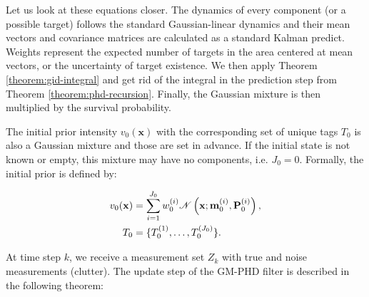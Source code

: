 Let us look at these equations closer. The dynamics of every component (or a possible target) follows the standard Gaussian-linear dynamics and their mean vectors and covariance matrices are calculated as a standard Kalman predict. Weights represent the expected number of targets in the area centered at mean vectors, or the uncertainty of target existence. We then apply Theorem \ref{theorem:gid-integral} and get rid of the integral in the prediction step from Theorem \ref{theorem:phd-recursion}. Finally, the Gaussian mixture is then multiplied by the survival probability.

The initial prior intensity $v_{0}(\mathbf{x})$ with the corresponding set of unique tags $T_0$ is also a Gaussian mixture and those are set in advance. If the initial state is not known or empty, this mixture may have no components, i.e. $J_0 = 0$. Formally, the initial prior is defined by:

\begin{align}
    v_0(\mathbf{x}) &= \sum_{i=1}^{J_0} w_{0}^{(i)} \mathscr{N}\left(\mathbf{x}; \vecat{m}{0}^{(i)}, \vecat{P}{0}^{(i)}\right), \\
    T_0 &= \{ T_0^{(1)}, \ldots, T_0^{(J_0)} \}.
\end{align}

At time step $k$, we receive a measurement set $Z_k$ with true and noise measurements (clutter). The update step of the GM-PHD filter is described in the following theorem:

